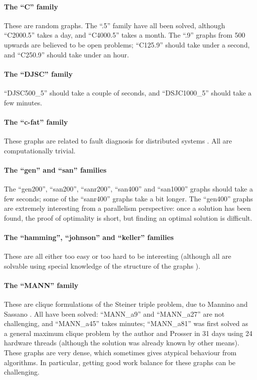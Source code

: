 \documentclass[a4paper]{article}
\begin{document}
\paragraph{The ``C'' family} These are random graphs. The ``.5'' family have all been solved,
although ``C2000.5'' takes a day, and ``C4000.5'' takes a month. The ``.9'' graphs from 500 upwards
are believed to be open problems; ``C125.9'' should take under a second, and ``C250.9'' should take
under an hour.

\paragraph{The ``DJSC'' family} ``DJSC500\_5'' should take a couple of seconds, and ``DSJC1000\_5''
should take a few minutes.

\paragraph{The ``c-fat'' family} These graphs are related to fault diagnosis for distributed
systems \cite{Berman:1990}. All are computationally trivial.

\paragraph{The ``gen'' and ``san'' families} The ``gen200'', ``san200'', ``sanr200'', ``san400'' and
``san1000'' graphs should take a few seconds; some of the ``sanr400'' graphs take a bit longer. The
``gen400'' graphs are extremely interesting from a parallelism perspective: once a solution has been
found, the proof of optimality is short, but finding an optimal solution is difficult.

\paragraph{The ``hamming'', ``johnson'' and ``keller'' families} These are all either too easy or
too hard to be interesting (although all are solvable using special knowledge of the structure of
the graphs \cite{Debroni:2011}).

\paragraph{The ``MANN'' family} These are clique formulations of the Steiner triple problem, due to
Mannino and Sassano \cite{Mannino:1995}. All have been solved: ``MANN\_a9'' and ``MANN\_a27'' are
not challenging, and ``MANN\_a45'' takes minutes; ``MANN\_a81'' was first solved as a general
maximum clique problem by the author and Prosser \cite{McCreesh:2013} in 31 days using 24 hardware
threads (although the solution was already known by other means). These graphs are very dense, which
sometimes gives atypical behaviour from algorithms. In particular, getting good work balance for
these graphs can be challenging.
\end{document}
